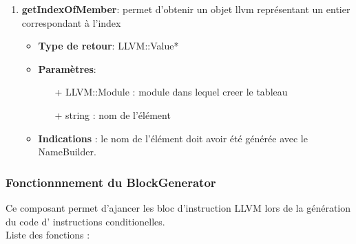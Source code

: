 \documentclass{article}
\begin{document}
\begin{enumerate}
  \item \textbf{getIndexOfMember}: permet d'obtenir un objet llvm représentant un entier correspondant à l'index
    \begin{itemize}
    \item \textbf{Type de retour}: LLVM::Value*
    \item \textbf{Paramètres}:
    \begin{enumerate}
      \item[+] LLVM::Module : module dans lequel creer le tableau
      \item[+] string : nom de l'élément
    \end{enumerate}
    \item \textbf{Indications} : le nom de l'élément doit avoir été générée avec le NameBuilder.
  \end{itemize}

  \end{enumerate}

   \subsubsection{Fonctionnnement du BlockGenerator}

   Ce composant permet d'ajancer les bloc d'instruction LLVM lors de la génération du code d' instructions conditionelles.
   \\Liste des fonctions :\
  
\end{document}
